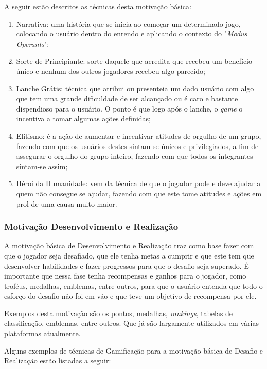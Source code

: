 A seguir estão descritos as técnicas desta motivação básica:

\begin{enumerate}
    \item Narrativa: uma história que se inicia ao começar um determinado
        jogo, colocando o usuário dentro do enrendo e aplicando o contexto
        do "\textit{Modus Operants}";
    \item Sorte de Principiante: sorte daquele que acredita que recebeu
        um benefício único e nenhum dos outros jogadores recebeu algo
        parecido;
    \item Lanche Grátis: técnica que atribui ou presenteia um dado usuário
        com algo que tem uma grande dificuldade de ser alcançado ou é
        caro e bastante dispendioso para o usuário.
        O ponto é que logo após o lanche, o \textit{game} o incentiva a tomar
        algumas ações definidas;
    \item Elitismo: é a ação de aumentar e incentivar atitudes de orgulho
        de um grupo, fazendo com que os usuários destes sintam-se
        únicos e privilegiados, a fim de assegurar o orgulho do
        grupo inteiro, fazendo com que todos os integrantes sintam-se assim;
    \item Héroi da Humanidade: vem da técnica de que o jogador pode e deve
        ajudar a quem não consegue se ajudar, fazendo com que este tome
        atitudes e ações em prol de uma causa muito maior.
\end{enumerate}

\subsubsection{Motivação Desenvolvimento e Realização}
\label{sub:desenvolvimentoerealizacao}
A motivação básica de Desenvolvimento e Realização traz como base fazer
com que o jogador seja desafiado, que ele tenha metas a cumprir e que este
tem que desenvolver habilidades e fazer progressos para que o desafio
seja superado. É importante que nessa fase tenha recompensas e ganhos para
o jogador, como troféus, medalhas, emblemas, entre outros, para que o
usuário entenda que todo o esforço do desafio não foi em vão e que
teve um objetivo de recompensa por ele.

Exemplos desta motivação são os pontos, medalhas, \textit{rankings}, tabelas de
classificação, emblemas, entre outros. Que já são largamente utilizados
em várias plataformas atualmente.

Alguns exemplos de técnicas de Gamificação para a motivação básica
de Desafio e Realização estão listadas a seguir:

